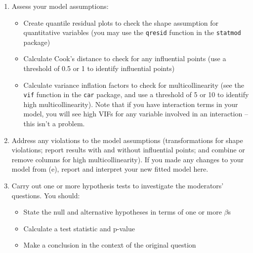 \documentclass[11pt]{article}
\begin{document}
\begin{enumerate}
\begin{enumerate}
\item Assess your model assumptions:
\begin{itemize}
\item Create quantile residual plots to check the shape assumption for quantitative variables (you may use the \texttt{qresid} function in the \texttt{statmod} package)
\item Calculate Cook's distance to check for any influential points (use a threshold of 0.5 or 1 to identify influential points)
\item Calculate variance inflation factors to check for multicollinearity (see the \texttt{vif} function in the \texttt{car} package, and use a threshold of 5 or 10 to identify high multicollinearity). Note that if you have interaction terms in your model, you will see high VIFs for any variable involved in an interaction -- this isn't a problem.
\end{itemize}
\item Address any violations to the model assumptions (transformations for shape violations; report results with and without influential points; and combine or remove columns for high multicollinearity). If you made any changes to your model from (e), report and interpret your new fitted model here.
\item Carry out one or more hypothesis tests to investigate the moderators' questions. You should:
\begin{itemize}
\item State the null and alternative hypotheses in terms of one or more $\beta$s
\item Calculate a test statistic and p-value
\item Make a conclusion in the context of the original question
\end{itemize}
\end{enumerate} 
\end{enumerate}
\end{document}

